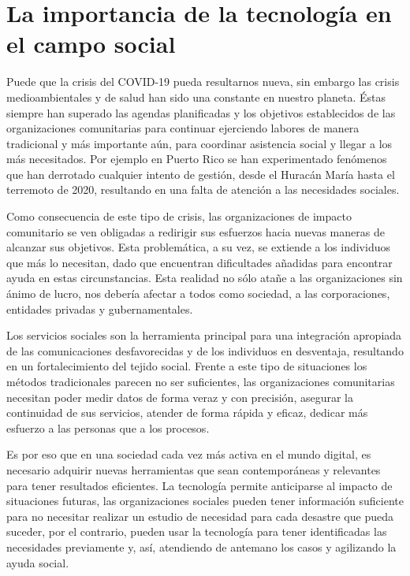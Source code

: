 \section{La importancia de la tecnología en el campo social}
Puede que la crisis del COVID-19 pueda resultarnos nueva, sin embargo las crisis medioambientales y de salud han sido una constante en nuestro planeta. Éstas siempre han superado las agendas planificadas y los objetivos establecidos de las organizaciones comunitarias para continuar ejerciendo labores de manera tradicional y más importante aún, para coordinar asistencia social y llegar a los más necesitados. Por ejemplo en Puerto Rico se han experimentado fenómenos que han derrotado cualquier intento de gestión, desde el Huracán María hasta el terremoto de 2020, resultando en una falta de atención a las necesidades sociales.
\vspace{1em}
\par Como consecuencia de este tipo de crisis, las organizaciones de impacto comunitario se ven obligadas a redirigir sus esfuerzos hacia nuevas maneras de alcanzar sus objetivos. Esta problemática, a su vez, se extiende a los individuos que más lo necesitan, dado que encuentran dificultades añadidas para encontrar ayuda en estas circunstancias.
\clearpage
Esta realidad no sólo atañe a las organizaciones sin ánimo de lucro, nos debería afectar a todos como sociedad, a las corporaciones, entidades privadas y gubernamentales.
\vspace{1em}
\par Los servicios sociales son la herramienta principal para una integración apropiada de las comunicaciones desfavorecidas y de los individuos en desventaja, resultando en un fortalecimiento del tejido social. Frente a este tipo de situaciones los métodos tradicionales parecen no ser suficientes, las organizaciones comunitarias necesitan poder medir datos de forma veraz y con precisión, asegurar la continuidad de sus servicios, atender de forma rápida y eficaz, dedicar más esfuerzo a las personas que a los procesos.
\vspace{1em}
\par Es por eso que en una sociedad cada vez más activa en el mundo digital, es necesario adquirir nuevas herramientas que sean contemporáneas y relevantes para tener resultados eficientes. La tecnología permite anticiparse al impacto de situaciones futuras, las organizaciones sociales pueden tener información suficiente para no necesitar realizar un estudio de necesidad para cada desastre que pueda suceder, por el contrario, pueden usar la tecnología para tener identificadas las necesidades previamente y, así, atendiendo de antemano los casos y agilizando la ayuda social.
